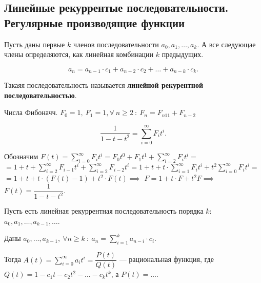 
\subsection{Линейные рекуррентые последовательности. Регулярные производящие функции}


\begin{definition}

    Пусть даны первые $k$ членов последовательности $a_0, a_1, \dots, a_k$.
    А все следующае члены определяются, как линейная комбинации $k$ предыдущих.

    \[a_n = a_{n-1} \cdot c_1 + a_{n-2} \cdot c_2 + \dots + a_{n-k} \cdot c_k. \]

    Такаяя последовательность называется \textbf{линейной рекурентной последовательностью}.
\end{definition}

\begin{example}
    Числа Фибоначч. $F_0 = 1, ~ F_1= 1, \forall ~ n \geqslant 2 ~:~ F_n = F_{n 1 1} + F_{n - 2}$

    \[
        \dfrac{1}{1 - t - t^2} = \sum_{i=0}^{\infty} F_i t^i.
    \]
\end{example}

Обозначим $F(t) = \sum\limits_{i=0}^\infty F_i t^i = F_0 t^0 + F_1 t^1 + \sum_{i=2}^\infty F_i t^i = $\\
$ = 1 + t + \sum_{i=2}^\infty F_{i-1} t^i + \sum_{i=2}^\infty F_{i-2} t^i = 1 + t + t \cdot \sum_{i=1}^\infty F_i t^i + t^2 \sum_{i = 0}^\infty F_i t^i = $\\
$ = 1 + t + t \cdot ( F(t) - 1 ) + t^2 \cdot F(t) \implies$
$F = 1 + t \cdot F + t^2 F \implies$\\
$F(t) = \dfrac{1}{1 - t  - t^2}$.

\begin{theorem}
    Пусть есть линейная рекуррентная последовательность порядка $k$:\\
     $a_0, a_1, \dots, a_{k-1}, \dots$.
    
    Даны $a_0, \dots, a_{k-1}, ~ \forall n \geqslant k~:~ a_n = \sum_{i = 1}^k a_{n-i} \cdot c_i$.

    Тогда $A(t) = \sum_{i=0}^\infty a_i t^i = \dfrac{P(t)}{Q(t)}$ --- рациональная функция, где \\
    $Q(t) = 1 - c_1 t - c_2 t^2 - \dots - c_{k} t^k$, а $P(t) = \dots$.
\end{theorem}


